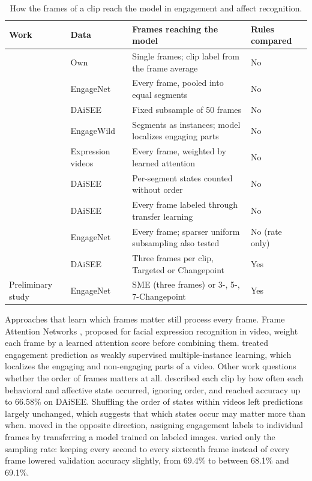 \begin{table}[t]
   \centering
   \caption[How frames reach the model]{How the frames of a clip reach the model in engagement and affect recognition.}
   \label{tab:rw-frameuse}
   \small
   \begin{tabular}{L{3.2cm}L{2.1cm}L{4.9cm}>{\centering\arraybackslash}p{2.5cm}}
      \toprule
      Work & Data & Frames reaching the model & Rules compared \\
      \midrule
       & Own & Single frames; clip label from the frame average & No \\
       & EngageNet & Every frame, pooled into equal segments & No \\
       & DAiSEE & Fixed subsample of 50 frames & No \\
       & EngageWild & Segments as instances; model localizes engaging parts & No \\
       & Expression videos & Every frame, weighted by learned attention & No \\
       & DAiSEE & Per-segment states counted without order & No \\
       & DAiSEE & Every frame labeled through transfer learning & No \\
       & EngageNet & Every frame; sparser uniform subsampling also tested & No (rate only) \\
       & DAiSEE & Three frames per clip, Targeted or Changepoint & Yes \\
      Preliminary study \cite{sityar2026icce} & EngageNet & SME (three frames) or 3-, 5-, 7-Changepoint & Yes \\
      \bottomrule
   \end{tabular}
\end{table}

Approaches that learn which frames matter still process every frame. Frame Attention Networks \cite{meng2019}, proposed for facial expression recognition in video, weight each frame by a learned attention score before combining them.  treated engagement prediction as weakly supervised multiple-instance learning, which localizes the engaging and non-engaging parts of a video. Other work questions whether the order of frames matters at all.  described each clip by how often each behavioral and affective state occurred, ignoring order, and reached accuracy up to 66.58\% on DAiSEE. Shuffling the order of states within videos left predictions largely unchanged, which suggests that which states occur may matter more than when.  moved in the opposite direction, assigning engagement labels to individual frames by transferring a model trained on labeled images.  varied only the sampling rate: keeping every second to every sixteenth frame instead of every frame lowered validation accuracy slightly, from 69.4\% to between 68.1\% and 69.1\%.

